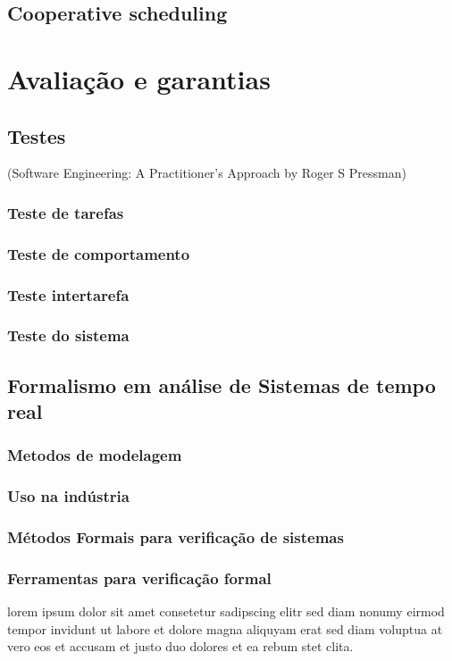 \subsection{Cooperative scheduling}


\section{\label{sec:secao5}Avaliação e garantias}
\subsection{Testes}
(Software Engineering: A Practitioner's Approach by Roger S Pressman)
\subsubsection{Teste de tarefas}
\subsubsection{Teste de comportamento}
\subsubsection{Teste intertarefa}
\subsubsection{Teste do sistema}

\subsection{Formalismo em análise de Sistemas de tempo real}
\subsubsection{Metodos de modelagem}
\subsubsection{Uso na indústria}
\subsubsection{Métodos Formais para verificação de sistemas}
\subsubsection{Ferramentas para verificação formal}
lorem ipsum dolor sit amet consetetur sadipscing elitr sed diam nonumy
eirmod tempor invidunt ut labore et dolore magna aliquyam erat sed diam
voluptua at vero eos et accusam et justo duo dolores et ea rebum
stet clita.~\cite{GOLDENBERGAPL02}
